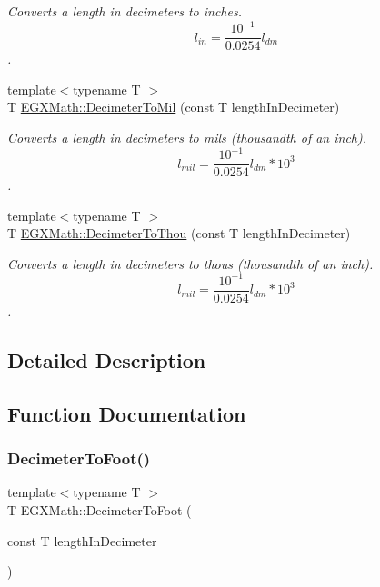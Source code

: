 \begin{DoxyCompactItemize}
\begin{DoxyCompactList}\small\item\em Converts a length in decimeters to inches. \[ l_{in}= \frac{10^{-1}}{0.0254} l_{dm} \]. \end{DoxyCompactList}\item 
{\footnotesize template$<$typename T $>$ }\\T \mbox{\hyperlink{group___e_g_x_math-_conversions-_length_conversions-_s_i-_decimeter-_imperial_gad2ce3f2de1fdda0216bdb56c4844b5e5}{E\+G\+X\+Math\+::\+Decimeter\+To\+Mil}} (const T length\+In\+Decimeter)
\begin{DoxyCompactList}\small\item\em Converts a length in decimeters to mils (thousandth of an inch). \[ l_{mil}= \frac{10^{-1}}{0.0254} l_{dm} * 10^{3} \]. \end{DoxyCompactList}\item 
{\footnotesize template$<$typename T $>$ }\\T \mbox{\hyperlink{group___e_g_x_math-_conversions-_length_conversions-_s_i-_decimeter-_imperial_gafc294e549fcdd1c43545ca9624abcafb}{E\+G\+X\+Math\+::\+Decimeter\+To\+Thou}} (const T length\+In\+Decimeter)
\begin{DoxyCompactList}\small\item\em Converts a length in decimeters to thous (thousandth of an inch). \[ l_{mil}= \frac{10^{-1}}{0.0254} l_{dm} * 10^{3} \]. \end{DoxyCompactList}\end{DoxyCompactItemize}


\subsection{Detailed Description}


\subsection{Function Documentation}
\mbox{\label{group___e_g_x_math-_conversions-_length_conversions-_s_i-_decimeter-_imperial_gaf86c80f8ce1e5ab6113a2a912c1f446e}} 
\subsubsection{\texorpdfstring{Decimeter\+To\+Foot()}{DecimeterToFoot()}}
{\footnotesize\ttfamily template$<$typename T $>$ \\
T E\+G\+X\+Math\+::\+Decimeter\+To\+Foot (\begin{DoxyParamCaption}\item[{const T}]{length\+In\+Decimeter }\end{DoxyParamCaption})}



